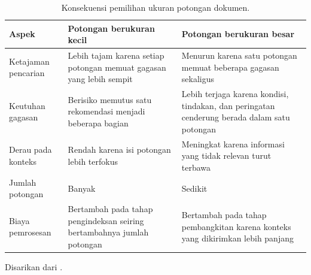 \begin{table}[htbp]
\centering
\caption{Konsekuensi pemilihan ukuran potongan dokumen.}
\label{tab:ukuran-potongan}
\small
\begin{tabular}{@{}p{3.0cm}p{5.05cm}p{5.0cm}@{}}
\toprule
\textbf{Aspek} & \textbf{Potongan berukuran kecil} & \textbf{Potongan berukuran besar} \\
\midrule
Ketajaman pencarian & Lebih tajam karena setiap potongan memuat gagasan yang lebih sempit & Menurun karena satu potongan memuat beberapa gagasan sekaligus \\[2pt]
Keutuhan gagasan & Berisiko memutus satu rekomendasi menjadi beberapa bagian & Lebih terjaga karena kondisi, tindakan, dan peringatan cenderung berada dalam satu potongan \\[2pt]
Derau pada konteks & Rendah karena isi potongan lebih terfokus & Meningkat karena informasi yang tidak relevan turut terbawa \\[2pt]
Jumlah potongan & Banyak & Sedikit \\[2pt]
Biaya pemrosesan & Bertambah pada tahap pengindeksan seiring bertambahnya jumlah potongan & Bertambah pada tahap pembangkitan karena konteks yang dikirimkan lebih panjang \\
\bottomrule
\end{tabular}

\vspace{2pt}
\footnotesize Disarikan dari \textcite{gao2023}.\normalsize
\end{table}
